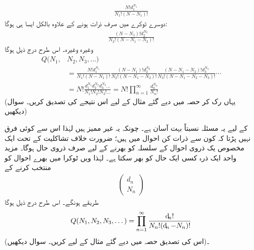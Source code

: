 \begin{align*}
\frac{N ! d_1^{N_1}}{N_1 ! (N - N_1) !}
\end{align*}
دوسرے ٹوکرے میں صرف  ذرات ہونے کے علاوہ بالکل ایسا ہی ہوگا:
\begin{align*}
\frac{(N - N_1) ! d_2^{N_2}}{N_2 ! (N - N_1 - N_2) !}
\end{align*}
وغیرہ وغیرہ۔ اس طرح درج ذیل ہوگا 
\begin{align}\label{مساوات_متماثل_قابل_ممیز_اجتماعات}
Q (N_1 , &N_2 , N_3 , \dotsc) \nonumber\\
&= \frac{N ! d_1^{N_1}}{N_1 ! (N - N_1) !} \frac{(N - N_1) ! d_2^{N_2}}{N_2 ! (N - N_1 - N_2) !} \frac{(N - N_1 - N_2) ! d_3^{N_3}}{N_3 ! (N - N_1 - N_2 - N_3) !} \cdots \nonumber\\
&= N ! \frac{d_1^{N_1} d_2^{N_2} d_3^{N_3} \dotsc}{N_1 ! N_2 ! N_3 ! \dotsc} = N! \prod_{n = 1}^{\infty} \frac{d_n^{N_n}}{N_n !}
\end{align}
(یہاں رک کر حصہ  میں دیے گئے مثال کے لیے اس نتیجے کی تصدیق کریں۔ سوال  دیکھیں)

 کے لیے یہ مسئلہ نسبتاً بہت آسان ہے۔ چونکہ یہ غیر ممیز ہیں لہٰذا اس سے کوئی فرق نہیں پڑتا کہ کون سے ذرات کن احوال میں ہیں؛ ضرورت خلاف تشاکلیت کے تحت ایک مخصوص یک ذروی احوال کے سلسلہ کو بھرنے کے لیے صرف   ذروی حال ہوگا۔ مزید واحد ایک ذرہ کسی ایک حال کو بھر سکتا ہے۔ لہٰذا  ویں ٹوکرا میں  بهرے احوال کو منتخب کرنے کے 
\begin{align*}
\begin{pmatrix}
d_n \\
N_n
\end{pmatrix}
\end{align*}
طریقے ہونگے۔ اس طرح درج ذیل ہوگا 
\begin{align}\label{مساوات_متماثل_فرمیان_اجتماعات}
Q (N_1 , N_2 , N_3 , \dotsc ) = \prod_{n = 1}^{\infty} \frac{\dif_n !}{N_n ! (\dif_n - N_n) !}
\end{align}
(اس کی تصدیق حصہ  میں دیے گئے مثال کے لیے کریں۔ سوال  دیکھیں)۔

